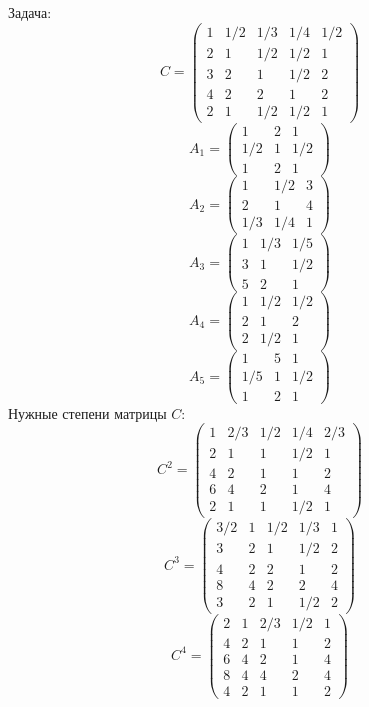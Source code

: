 Задача:
$$C= \begin{pmatrix}
1 & 1/2 & 1/3 & 1/4 & 1/2\\
2 & 1 & 1/2 & 1/2 & 1\\
3 & 2 & 1 & 1/2 & 2\\
4 & 2 & 2 & 1 & 2\\
2 & 1 & 1/2 & 1/2 & 1
\end{pmatrix}
$$
$$A_1= \begin{pmatrix}
1 & 2 & 1\\
1/2 & 1 & 1/2\\
1 & 2 & 1
\end{pmatrix}
$$
$$A_2= \begin{pmatrix}
1 & 1/2 & 3\\
2 & 1 & 4\\
1/3 & 1/4 & 1
\end{pmatrix}
$$
$$A_3= \begin{pmatrix}
1 & 1/3 & 1/5\\
3 & 1 & 1/2\\
5 & 2 & 1
\end{pmatrix}
$$
$$A_4= \begin{pmatrix}
1 & 1/2 & 1/2\\
2 & 1 & 2\\
2 & 1/2 & 1
\end{pmatrix}
$$
$$A_5= \begin{pmatrix}
1 & 5 & 1\\
1/5 & 1 & 1/2\\
1 & 2 & 1
\end{pmatrix}
$$
Нужные степени матрицы $C$:
$$C^2 = \begin{pmatrix}
1 & 2/3 & 1/2 & 1/4 & 2/3\\
2 & 1 & 1 & 1/2 & 1\\
4 & 2 & 1 & 1 & 2\\
6 & 4 & 2 & 1 & 4\\
2 & 1 & 1 & 1/2 & 1
\end{pmatrix}
$$
$$C^3 = \begin{pmatrix}
3/2 & 1 & 1/2 & 1/3 & 1\\
3 & 2 & 1 & 1/2 & 2\\
4 & 2 & 2 & 1 & 2\\
8 & 4 & 2 & 2 & 4\\
3 & 2 & 1 & 1/2 & 2
\end{pmatrix}
$$
$$C^4 = \begin{pmatrix}
2 & 1 & 2/3 & 1/2 & 1\\
4 & 2 & 1 & 1 & 2\\
6 & 4 & 2 & 1 & 4\\
8 & 4 & 4 & 2 & 4\\
4 & 2 & 1 & 1 & 2
\end{pmatrix}
$$
